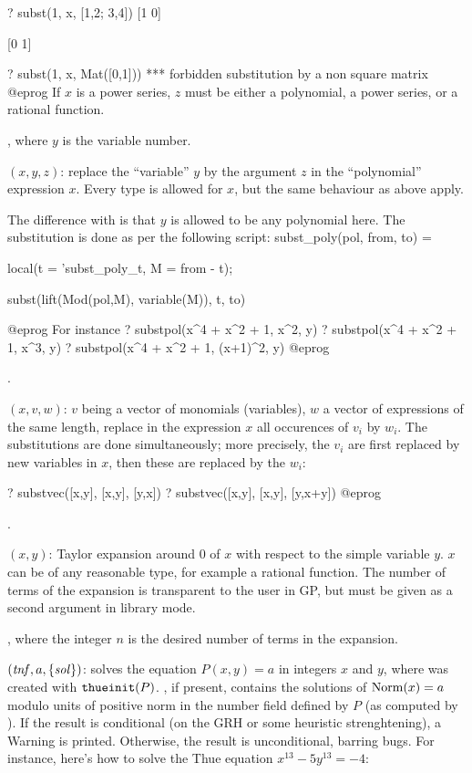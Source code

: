\bprog
? subst(1, x, [1,2; 3,4])
[1 0]

[0 1]

? subst(1, x, Mat([0,1]))
  ***   forbidden substitution by a non square matrix
@eprog\noindent
If $x$ is a power series, $z$ must be either a polynomial, a power
series, or a rational function.

, where $y$ is the variable number.

$(x,y,z)$:
replace the ``variable'' $y$ by the argument $z$ in the ``polynomial''
expression $x$. Every type is allowed for $x$, but the same behaviour
as  above apply.

The difference with  is that $y$ is allowed to be any polynomial
here. The substitution is done as per the following script:
\bprog
   subst_poly(pol, from, to) =
   { local(t = 'subst_poly_t, M = from - t);

     subst(lift(Mod(pol,M), variable(M)), t, to)
   }
@eprog\noindent
For instance
\bprog
? substpol(x^4 + x^2 + 1, x^2, y)
? substpol(x^4 + x^2 + 1, x^3, y)
? substpol(x^4 + x^2 + 1, (x+1)^2, y)
@eprog

.

$(x,v,w)$: $v$ being a vector of monomials (variables),
$w$ a vector of expressions of the same length, replace in the expression
$x$ all occurences of $v_i$ by $w_i$. The substitutions are done
simultaneously; more precisely, the $v_i$ are first replaced by new
variables in $x$, then these are replaced by the $w_i$:

\bprog
? substvec([x,y], [x,y], [y,x])
? substvec([x,y], [x,y], [y,x+y])
@eprog

.

$(x,y)$: Taylor expansion around $0$ of $x$ with respect
to\label{se:taylor}
the simple variable $y$. $x$ can be of any reasonable type, for example a
rational function. The number of terms of the expansion is transparent to the
user in GP, but must be given as a second argument in library mode.

, where the  integer $n$ is the desired number of
terms in the expansion.

$(\hbox{\it tnf\/},a,\{\hbox{\it sol\/}\})$: solves the equation
$P(x,y)=a$ in integers $x$ and $y$, where  was created with
${\tt thueinit}(P)$. , if present, contains the solutions of
${\rm Norm}(x)=a$ modulo units of positive norm in the number field
defined by $P$ (as computed by ). If the
result is conditional (on the GRH or some heuristic strenghtening),
a Warning is printed. Otherwise, the result is unconditional, barring bugs.
For instance, here's how to solve the Thue equation $x^{13} - 5y^{13} = - 4$:


